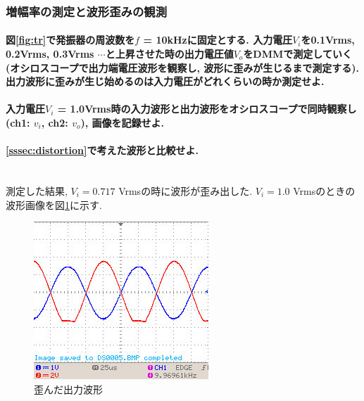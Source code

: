 \documentclass[titlepage]{jsarticle}
\begin{document}
        \subsubsection{増幅率の測定と波形歪みの観測}
            \paragraph{図\ref{fig:tr}で発振器の周波数を$f$ = 10kHzに固定とする. 入力電圧$V_i$を0.1Vrms, 0.2Vrms, 0.3Vrms $\cdots$と上昇させた時の出力電圧値$V_o$をDMMで測定していく(オシロスコープで出力端電圧波形を観察し, 波形に歪みが生じるまで測定する). 出力波形に歪みが生じ始めるのは入力電圧がどれくらいの時か測定せよ.}
            \paragraph{入力電圧$V_i$ = 1.0Vrms時の入力波形と出力波形をオシロスコープで同時観察し(ch1: $v_i$, ch2: $v_o$), 画像を記録せよ.}
            \paragraph{\ref{sssec:distortion}で考えた波形と比較せよ.}
            \mbox{} \\

                測定した結果, $V_i =  0.717$ Vrmsの時に波形が歪み出した.
                $V_i = 1.0$ Vrmsのときの波形画像を図\ref{fig:hzm}に示す.

                \begin{figure}[h]
                    \centering
                    \includegraphics[width=0.7\hsize]{images/AB_2-2-6_1Vrms.jpg}
                    \caption{歪んだ出力波形}
                    \label{fig:hzm}
                \end{figure}
\end{document}
